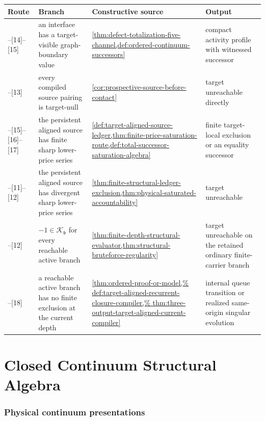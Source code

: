 \documentclass[11pt]{article}
\numberwithin{section}{part}
\theoremstyle{plain}
\theoremstyle{definition}
\theoremstyle{remark}
\begin{document}
\begin{longtable}{p{.13\linewidth}p{.25\linewidth}p{.34\linewidth}p{.15\linewidth}}
\toprule
Route & Branch & Constructive source & Output\\
\midrule
\relax
[6]--[14]--[15] & an interface has a target-visible graph-boundary value &
\cref{thm:defect-totalization-five-channel,def:ordered-continuum-successors} & compact activity profile with witnessed successor\\
\relax
[8]--[13] & every compiled source pairing is target-null &
\cref{cor:prospective-source-before-contact} & target unreachable directly\\
\relax
[10]--[15]--[16]--[17] & the persistent aligned source has finite sharp lower-price series &
\cref{def:target-aligned-source-ledger,thm:finite-price-saturation-route,def:total-successor-saturation-algebra}
& finite target-local exclusion or an equality successor\\
\relax
[10]--[11]--[12] & the persistent aligned source has divergent sharp
lower-price series &
\cref{thm:finite-structural-ledger-exclusion,thm:physical-saturated-accountability} & target unreachable\\
\relax
[17]--[12] & \(-1\in\mathcal K_{\mathfrak b}\) for every reachable active
branch &
\cref{thm:finite-depth-structural-evaluator,thm:structural-bruteforce-regularity} & target unreachable on the retained ordinary finite-carrier branch\\
\relax
[17]--[18] & a reachable active branch has no finite exclusion at the current
depth &
\cref{thm:ordered-proof-or-model,%
def:target-aligned-recurrent-closure-compiler,%
thm:three-output-target-aligned-current-compiler} & internal queue transition
or realized same-origin singular evolution\\
\bottomrule
\end{longtable}

\FloatBarrier

\part{Closed Continuum Structural Algebra}
\label{part:closed-algebra}

\section{Physical continuum presentations}
\label{sec:physical-presentations}
\end{document}
